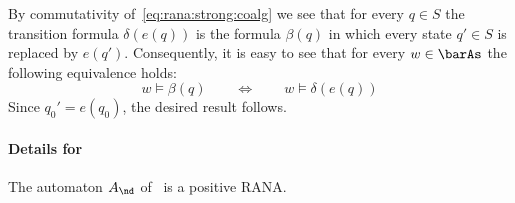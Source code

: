 \documentclass[10pt, final, conference, a4paper, twocolumn]{IEEEtran}
\begin{document}
By commutativity of~\eqref{eq:rana:strong:coalg} we see that for every $q \in S$ the transition formula $\delta(e(q))$ is the formula $\beta(q)$ in which every state $q'\in S$ is replaced by $e(q')$.
Consequently, it is easy to see that for every $w \in \barAs$ the following equivalence holds:
\[ w \vDash \beta(q) \qquad\Longleftrightarrow\qquad w \vDash \delta(e(q)) \]
Since $q_0' = e(q_0)$, the desired result follows.

\paragraph*{Details for~}

\begin{lem}
  The automaton $A_{\nd}$ of~ is a positive RANA.
\end{lem}
\end{document}
